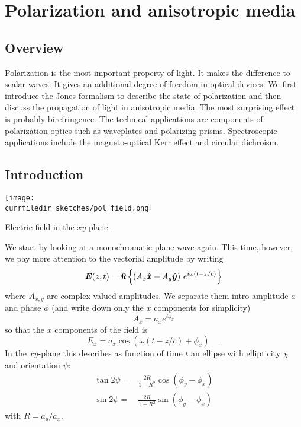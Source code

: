 \renewcommand{\lastmod}{December 7, 2023}
\renewcommand{\chapterauthors}{Markus Lippitz}

\chapter{Polarization and anisotropic media}





\section{Overview}

Polarization is the most important property of light. It makes the difference to scalar waves. It gives an additional degree of freedom in optical devices. We first introduce the Jones formalism to describe the state of polarization and then discuss the propagation of light in anisotropic media. The most surprising effect is probably birefringence. The technical applications are components of polarization optics such as waveplates and polarizing prisms. Spectroscopic applications include the magneto-optical Kerr effect and circular dichroism.


\section{Introduction}

\begin{marginfigure}
    \texttt{[image: \\currfiledir sketches/pol\_field.png]}
    \caption{Electric field in the $xy$-plane.}
\end{marginfigure}

We start by looking at a monochromatic plane wave again. This time, however, we pay more attention to the vectorial amplitude by writing
\begin{equation}
    \boldsymbol{E}(z,t) = \Re \left\{ 
    \left( A_x \hat{\boldsymbol{x}} + A_y \hat{\boldsymbol{y}} \right) \, e^{i \omega (t - z/c)}
    \right\}
\end{equation}
where $A_{x,y}$ are complex-valued amplitudes. We separate them intro amplitude $a$ and phase $\phi$ (and write down only the $x$ components for simplicity)
\begin{equation}
    A_x = a_x e^{i \phi_x}
\end{equation}
so that the $x$ components of the field is
\begin{equation}
    E_x = a_x \cos \left( \omega (t - z/c) + \phi_x \right) \quad .
\end{equation}
In the $xy$-plane this describes as function of time $t$ an ellipse with ellipticity $\chi$ and orientation $\psi$:
\begin{align}
    \tan 2 \psi = & \frac{2 R}{1 - R^2} \cos (\phi_y - \phi_x) \\
    \sin 2 \psi = & \frac{2 R}{1 - R^2} \sin (\phi_y - \phi_x) 
\end{align}
with $R = a_y / a_x$.

